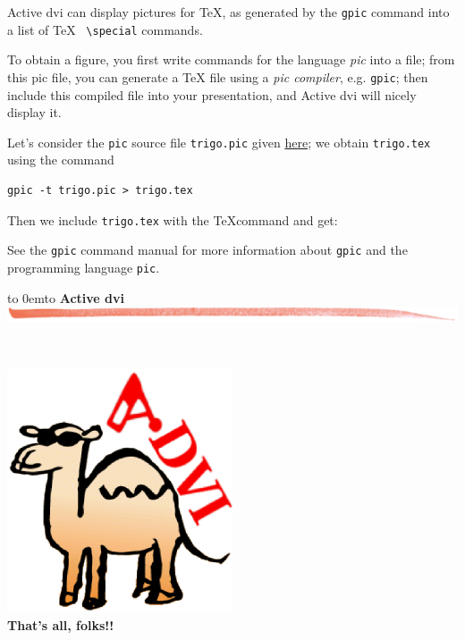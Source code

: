 \documentclass[12pt]{article}
\def\keymenu#1{\textcolor{red}{\underline{#1}}}
\def\advifooter{\vbox to 0em{\vbox to \vsize {\vfill
Press: \keymenu{n}ext page \keymenu{p}revious page
\keymenu{\textvisiblespace} next pause%
\hfill{\embedsticky{advianim}{1.56cm}{1.824cm}{animate -geometry !g! -window !p advilogo.anim.gif}}
} \vss}}
\def\adviheader{\noindent
{\bf\Large Active dvi}\\
\includegraphics[width=\textwidth]{../tex/bar.jpg.eps}}
\let \Newpage \newpage
\def \newpage {\Newpage \advifooter\adviheader}
\def\adviemptyfooter{\vbox to 0em{\vbox to \vsize {\vfill
~~\vss\killembed{advianim}}}}
\def\lastpage{\Newpage\adviemptyfooter\adviheader}
\begin{document}
Active dvi can display pictures for \TeX, as generated by
the \verb"gpic" command into a list of \TeX~ \verb"\special" commands.

\bigskip

To obtain a figure, you first write commands for the language
{\em pic} into a file; from this pic file, you can generate a \TeX
file using a {\em pic compiler}, e.g. \verb"gpic"; then include this
compiled file into your presentation, and Active dvi will nicely display it.

Let's consider the \verb"pic" source file \verb"trigo.pic" given
\hyperref{trigo_source.dvi}{}{}{here}; we obtain
\verb"trigo.tex" using the command 
\begin{verbatim}
gpic -t trigo.pic > trigo.tex
\end{verbatim}

Then we include \verb"trigo.tex" with the \TeX command
\verb|| and get:

\def\showgraph{%
  \par\medskip\centerline{\raise 1em\box\graph}\bigskip\noindent\ignorespaces}



See the \verb"gpic" command manual for more information about
\verb"gpic" and the programming language \verb"pic".

\lastpage

~\vfill
\begin{center}
\includegraphics[width=0.5\textwidth]{../tex/advilogo.eps}\\
{\Large \bf That's all, folks!!}
\end{center}
\vfill
\end{document}
